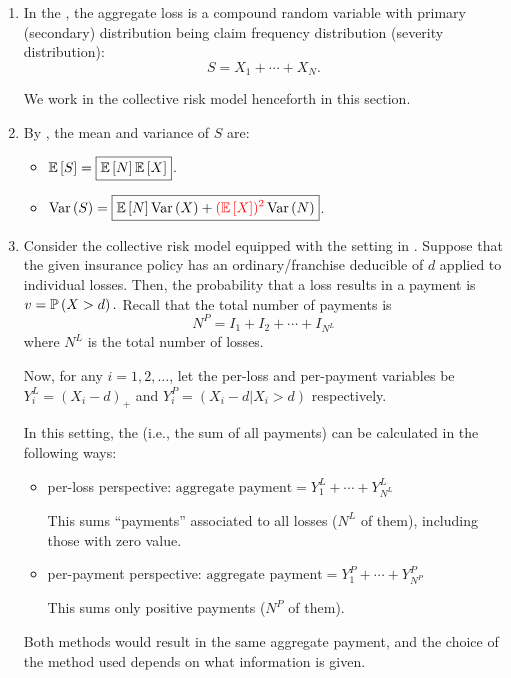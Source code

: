 \begin{enumerate}
\item In the , the aggregate loss is a compound
random variable with primary (secondary) distribution being claim frequency
distribution (severity distribution):
\[
S=X_1+\dotsb+X_N.
\]
We work in the collective risk model henceforth in this section.

\item \label{it:collective-risk-s-mean-var}
By , the mean and variance of \(S\) are:
\begin{itemize}
\item \(\mathbb{E}\left[S\right]=\boxed{\mathbb{E}\left[N\right]\mathbb{E}\left[X\right]}\).
\item \(\operatorname{Var}\left(S\right)=\boxed{\mathbb{E}\left[N\right]\operatorname{Var}\left(X\right)+{\color{red}(\mathbb{E}\left[X\right])^2}\operatorname{Var}\left(N\right)}\).
\end{itemize}

\item \label{it:agg-pmt-fmlas}
Consider the collective risk model equipped with the setting in
. Suppose that the given insurance policy has an
ordinary/franchise deducible of \(d\) applied to individual losses. Then, the
probability that a loss results in a payment is \(v=\mathbb{P}\left(X>d\right).\) Recall that
the total number of payments is
\[
N^P=I_1+I_2+\dotsb+I_{N^L}
\]
where \(N^L\) is the total number of losses.

Now, for any \(i=1,2,\dotsc\), let the per-loss and per-payment variables be
\(Y^L_i=(X_i-d)_{+}\) and \(Y^P_i=(X_i-d|X_i>d)\) respectively.

In this setting, the  (i.e., the sum of all payments)
can be calculated in the following ways:
\begin{itemize}
\item per-loss perspective: \(\text{aggregate payment}=\boxed{Y_1^L+\dotsb+Y_{N^L}^L}\)
\begin{intuition}
This sums ``payments'' associated to all losses (\(N^L\) of them), including those
with zero value.
\end{intuition}
\item per-payment perspective: \(\text{aggregate payment}=\boxed{Y_1^P+\dotsb+Y_{N^P}^P}\)
\begin{intuition}
This sums only positive payments (\(N^P\) of them).
\end{intuition}
\end{itemize}
Both methods would result in the same aggregate payment, and the choice of the
method used depends on what information is given.
\end{enumerate}
